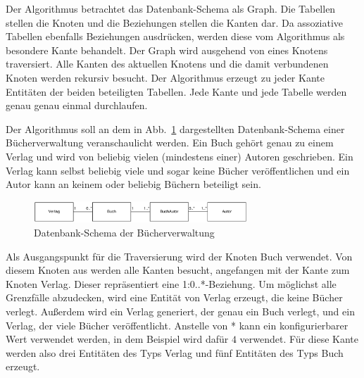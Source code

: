 	
  Der Algorithmus betrachtet das Datenbank-Schema als Graph. Die Tabellen stellen die Knoten und die Beziehungen stellen die Kanten dar.
  Da assoziative Tabellen ebenfalls Beziehungen ausdrücken, werden diese vom Algorithmus als besondere Kante behandelt. Der Graph wird
	ausgehend von eines Knotens traversiert. Alle Kanten des aktuellen Knotens und die damit verbundenen Knoten werden rekursiv besucht.
	Der Algorithmus erzeugt zu jeder Kante Entitäten der beiden beteiligten Tabellen. %
	Jede Kante und jede Tabelle werden genau genau einmal durchlaufen.
	
  Der Algorithmus soll an dem in Abb.~\ref{database} dargestellten Datenbank-Schema einer Bücherverwaltung veranschaulicht werden. Ein
	Buch gehört genau zu einem Verlag und wird von beliebig vielen (mindestens einer) Autoren geschrieben. Ein Verlag kann selbst beliebig
	viele und sogar keine Bücher veröffentlichen und ein Autor kann an keinem oder beliebig Büchern beteiligt sein.
	
	\begin{figure}[htb]
		\begin{center}
			\includegraphics[width=8cm]{images/database.png}
			\caption{\label{database}Datenbank-Schema der Bücherverwaltung}
		\end{center}
	\end{figure}
	
	Als Ausgangspunkt für die Traversierung wird der Knoten Buch verwendet. Von diesem Knoten aus werden alle Kanten besucht, angefangen mit
	der Kante zum Knoten Verlag. Dieser repräsentiert eine 1:0..*-Beziehung. Um möglichst alle Grenzfälle abzudecken, wird eine Entität
	von Verlag erzeugt, die keine Bücher verlegt. Außerdem wird ein Verlag generiert, der genau ein Buch verlegt, und ein Verlag, der viele
	Bücher veröffentlicht. Anstelle von * kann ein konfigurierbarer Wert verwendet werden, in dem Beispiel wird dafür $4$ verwendet. Für
	diese Kante werden also drei Entitäten des Typs Verlag und fünf Entitäten des Typs Buch erzeugt.
	
